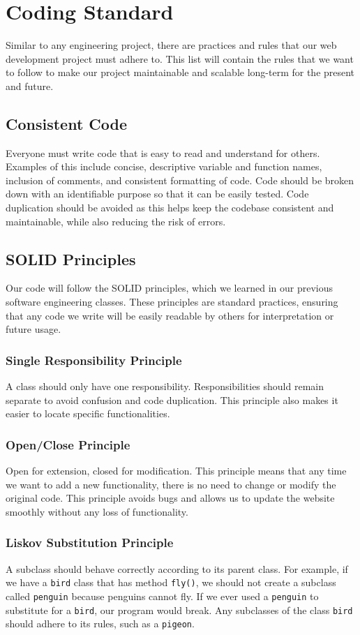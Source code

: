 \documentclass{article}
\begin{document}
\section{Coding Standard}
Similar to any engineering project, there are practices and rules that our web development project must adhere to. This list will contain the rules that we want to follow to make our project maintainable and scalable long-term for the present and future.

\subsection{Consistent Code}
Everyone must write code that is easy to read and understand for others. Examples of this include concise, descriptive variable and function names, inclusion of comments, and consistent formatting of code. Code should be broken down with an identifiable purpose so that it can be easily tested. Code duplication should be avoided as this helps keep the codebase consistent and maintainable, while also reducing the risk of errors.

\subsection{SOLID Principles}
Our code will follow the SOLID principles, which we learned in our previous software engineering classes. These principles are standard practices, ensuring that any code we write will be easily readable by others for interpretation or future usage.
\subsubsection*{Single Responsibility Principle}
A class should only have one responsibility. Responsibilities should remain separate to avoid confusion and code duplication. This principle also makes it easier to locate specific functionalities.

\subsubsection*{Open/Close Principle}
Open for extension, closed for modification. This principle means that any time we want to add a new functionality, there is no need to change or modify the original code. This principle avoids bugs and allows us to update the website smoothly without any loss of functionality.
\subsubsection*{Liskov Substitution Principle}
A subclass should behave correctly according to its parent class. For example, if we have a \texttt{bird} class that has method \texttt{fly()}, we should not create a subclass called \texttt{penguin} because penguins cannot fly. If we ever used a \texttt{penguin} to substitute for a \texttt{bird}, our program would break. Any subclasses of the class \texttt{bird} should adhere to its rules, such as a \texttt{pigeon}.
\end{document}
